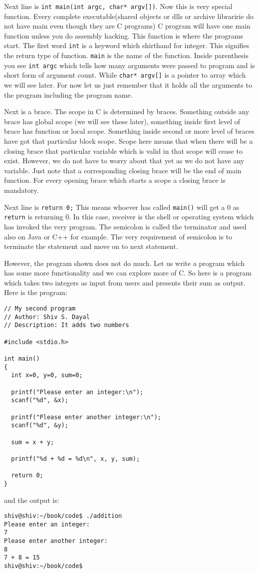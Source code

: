Next line is \texttt{int main(int argc, char* argv[])}. Now this is very special
function. Every complete executable(shared objects or dlls or archive
libraririe do not have main even though they are C programs) C program will
have one main function unless you do assembly hacking. This function is where
the programs start. The first word \texttt{int} is a keyword which shirthand
for integer. This signifies the return type of function. \texttt{main} is the
name of the function. Inside parenthesis you see \texttt{int argc} which tells
how many arguments were passed to program and is short form of argument
count. While \texttt{char* argv[]} is a pointer to array which we will see
later. For now let us just remember that it holds all the arguments to the
program including the program name.

Next is a brace. The scope in C is determined by braces. Something outside any
brace has global scope (we will see these later), something inside first level
of brace has function or local scope. Something inside second or more level of
braces have got that particular block scope. Scope here means that when there
will be a closing brace that particular variable which is valid in that scope
will cease to exist. However, we do not have to worry about that yet as we do
not have any variable. Just note that a corresponding closing brace will be the
end of main function. For every opening brace which starts a scope a closing
brace is mandatory.

Next line is \texttt{return 0;} This means whoever has called \texttt{main()}
will get a 0 as \texttt{return} is returning 0. In this case, receiver is the
shell or operating system 
which has invoked the very program. The semicolon is called the terminator and
used also on Java or C++ for example. The very requirement of semicolon is to
terminate the statement and move on to next statement.

However, the program shown does not do much. Let us write a program which has
some more functionality and we can explore more of C. So here is a program
which takes two integers as input from users and presents their sum as
output. Here is the program:

\begin{verbatim}
// My second program
// Author: Shiv S. Dayal
// Description: It adds two numbers

#include <stdio.h>

int main()
{
  int x=0, y=0, sum=0;

  printf("Please enter an integer:\n");
  scanf("%d", &x);

  printf("Please enter another integer:\n");
  scanf("%d", &y);

  sum = x + y;

  printf("%d + %d = %d\n", x, y, sum);

  return 0;
}
\end{verbatim}
and the output is:
\begin{verbatim}
shiv@shiv:~/book/code$ ./addition
Please enter an integer:
7
Please enter another integer:
8
7 + 8 = 15
shiv@shiv:~/book/code$
\end{verbatim}

